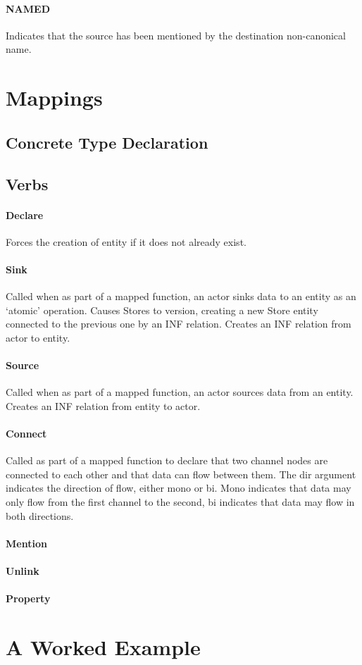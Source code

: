 \documentclass[12pt,twoside,a4paper]{article}
\begin{document}
\paragraph{NAMED}
Indicates that the source has been mentioned by the destination non-canonical name.

\section{Mappings}

\subsection{Concrete Type Declaration}

\subsection{Verbs}

\paragraph{Declare}
Forces the creation of entity if it does not already exist.

\paragraph{Sink}
Called when as part of a mapped function, an actor sinks data to an entity as an ‘atomic’ operation.
Causes Stores to version, creating a new Store entity connected to the previous one by an INF relation.
Creates an INF relation from actor to entity. 

\paragraph{Source}
Called when as part of a mapped function, an actor sources data from an entity.
Creates an INF relation from entity to actor.

\paragraph{Connect}
Called as part of a mapped function to declare that two channel nodes are connected to each other and that data can flow between them. The dir argument indicates the direction of flow, either mono or bi. Mono indicates that data may only flow from the first channel to the second, bi indicates that data may flow in both directions. 

\paragraph{Mention}

\paragraph{Unlink}

\paragraph{Property}

\section{A Worked Example}
\end{document}
